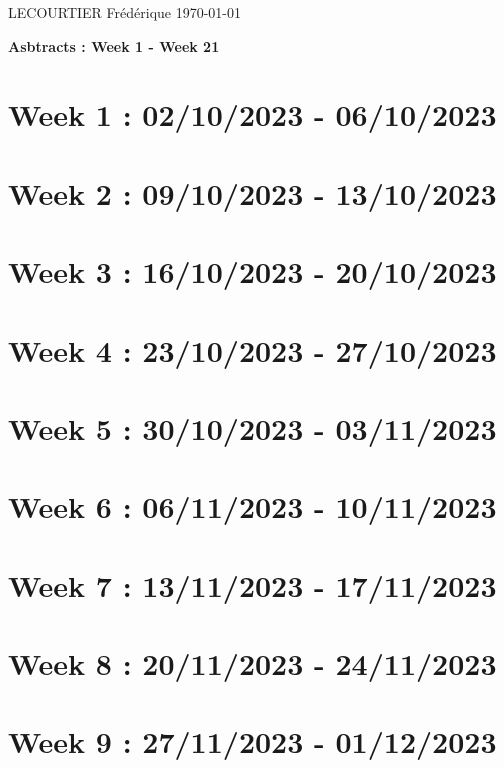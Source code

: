 \documentclass[french]{article}
\begin{document}
	LECOURTIER Frédérique \hfill \today
	\begin{center}
		\Large\textbf{{Asbtracts : Week 1 - Week 21}}
	\end{center}

	\section{Week 1 : 02/10/2023 - 06/10/2023}
	

	\section{Week 2 : 09/10/2023 - 13/10/2023}
	

	\section{Week 3 : 16/10/2023 - 20/10/2023}
	

	\section{Week 4 : 23/10/2023 - 27/10/2023}
	

	\section{Week 5 : 30/10/2023 - 03/11/2023}
	

	\section{Week 6 : 06/11/2023 - 10/11/2023}
	

	\section{Week 7 : 13/11/2023 - 17/11/2023}
	

	\section{Week 8 : 20/11/2023 - 24/11/2023}
	

	\section{Week 9 : 27/11/2023 - 01/12/2023}
	
\end{document}
